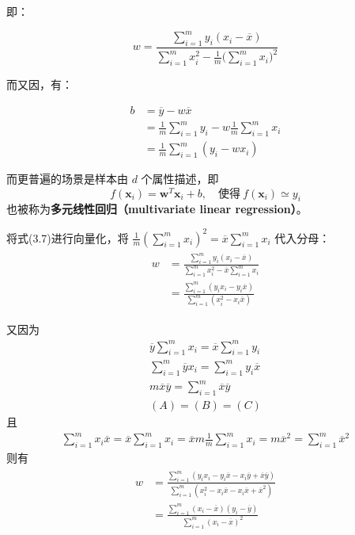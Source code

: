 \documentclass[../studies-ml.tex]{subfiles}
\begin{document}
即：

\begin{equation}
  w = \frac{\sum\limits_{i=1}^{m} y_i(x_i - \overline{x})}{\sum\limits_{i=1}^{m} x_i^2 - \frac{1}{m}\biggl(\sum\limits_{i=1}^{m}x_i\biggr)^2}
\end{equation}

而又因，有：

\begin{equation}
  \begin{split}
    b & = \overline{y} - w\overline{x} \\
    & = \frac{1}{m}\sum_{i=1}^{m} y_i - w\frac{1}{m}\sum_{i=1}^{m} x_i \\
    & = \frac{1}{m}\sum_{i=1}^{m} (y_i - w x_i)
  \end{split}
\end{equation}

而更普遍的场景是样本由 $d$ 个属性描述，即
\[
  f(\pmb{x}_i) = \pmb{w}^T \pmb{x}_i + b, \quad \text{使得}\ f(\pmb{x}_i) \simeq y_i
\]
也被称为\textbf{多元线性回归（multivariate linear regression）}。

\begin{anote}
  将式(3.7)进行向量化，将 $\frac{1}{m}(\sum\limits_{i=1}^{m} x_i)^2 = \overline{x}\sum\limits_{i=1}^{m} x_i$ 代入分母：
  \begin{align*}
    \begin{split}
      w & = \frac{\sum_{i=1}^{m}y_i(x_i-\overline{x})}{\sum_{i=1}^{m}x_i^2 - \overline{x}\sum_{i=1}^{m}x_i} \\
      & = \frac{\sum_{i=1}^{m}(y_i x_i- y_i \overline{x})}{\sum_{i=1}^{m}(x_i^2 - x_i \overline{x})}
    \end{split}
  \end{align*}

  又因为
  \begin{gather*}
    \overline{y}\sum_{i=1}^{m}x_i = \overline{x}\sum_{i=1}^{m}y_i \tag{A} \\
    \sum_{i=1}^{m}\overline{y}x_i = \sum_{i=1}^{m}y_i\overline{x} \tag{B} \\
    m\overline{x}\overline{y} = \sum_{i=1}^{m}\overline{x}\overline{y} \tag{C} \\
    (A) = (B) = (C)
  \end{gather*}
  且
  \begin{gather*}
    \sum_{i=1}^{m}x_i\overline{x} = \overline{x}\sum_{i=1}^{m}x_i =
    \overline{x}m\frac{1}{m}\sum_{i=1}^{m}x_i = m\overline{x}^2 =
    \sum_{i=1}^{m}\overline{x}^2
  \end{gather*}
  则有
  \begin{align*}
    \begin{split}
      w & = \frac{\sum\limits_{i=1}^m(y_i x_i - y_i \overline{x} - x_i \overline{y} + \overline{x}\overline{y})}
      {\sum\limits_{i=1}^m(x_i^2 - x_i\overline{x} - x_i\overline{x} + \overline{x}^2)} \\
      & = \frac{\sum\limits_{i=1}^{m}(x_i-\overline{x})(y_i-\overline{y})}{\sum\limits_{i=1}^{m}(x_i - \overline{x})^2}
    \end{split}
  \end{align*}
\end{anote}
\end{document}
